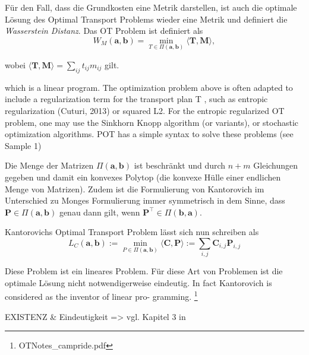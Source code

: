 \documentclass[twoside, 11pt,a4paper]{article}
\numberwithin{equation}{section}
\begin{document}
	Für den Fall, dass die Grundkosten eine Metrik darstellen, ist auch die optimale Lösung des Optimal Transport Problems wieder eine Metrik \cite{cuturi2014ground} und definiert die \textit{Wasserstein Distanz}. Das OT Problem ist definiert als
	\begin{equation}
	W_M(\boldsymbol{a},\boldsymbol{b}) = \min_{T \in \Pi(\boldsymbol{a}, \boldsymbol{b})}{\langle \boldsymbol{T}, \boldsymbol{M} \rangle},
	\end{equation}
	
	wobei ${\langle \boldsymbol{T}, \boldsymbol{M} \rangle} = \sum_{ij}{t_{ij}m_{ij}}$ gilt.
	
	which is a linear program. The optimization problem above is often adapted to include a
	regularization term for the transport plan T , such as entropic regularization (Cuturi, 2013)
	or squared L2. For the entropic regularized OT problem, one may use the Sinkhorn Knopp
	algorithm (or variants), or stochastic optimization algorithms. POT has a simple syntax to
	solve these problems (see Sample 1)
	
	Die Menge der Matrizen $\Pi(\boldsymbol{a}, \boldsymbol{b})$ ist beschränkt und durch $n+m$ Gleichungen gegeben und damit ein konvexes Polytop (die konvexe Hülle einer endlichen Menge von Matrizen). Zudem ist die Formulierung von Kantorovich im Unterschied zu Monges Formulierung immer symmetrisch in dem Sinne, dass $\boldsymbol{P} \in \Pi (\boldsymbol{a}, \boldsymbol{b})$ genau dann gilt, wenn $\boldsymbol{P}^\top \in \Pi (\boldsymbol{b}, \boldsymbol{a})$.
	
	Kantorovichs Optimal Transport Problem lässt sich nun schreiben als 
	\begin{equation}
	L_C(\boldsymbol{a}, \boldsymbol{b}) := \min_{P \in \Pi(\boldsymbol{a}, \boldsymbol{b})} \langle \boldsymbol{C}, \boldsymbol{P} \rangle := \sum_{i,j}{\boldsymbol{C}_{i,j}\boldsymbol{P}_{i,j}}
	\end{equation}
	
	Diese Problem ist ein lineares Problem. Für diese Art von Problemen ist die optimale Lösung nicht notwendigerweise eindeutig. In fact Kantorovich is considered as the inventor of linear pro-
	gramming. \footnote{OTNotes\_campride.pdf}
	
	EXISTENZ \& Eindeutigkeit => vgl. Kapitel 3 in \cite{computationalOT}
	
\end{document}
